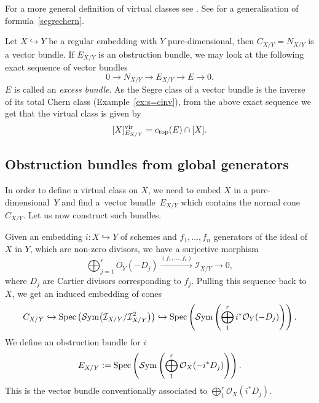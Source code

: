 \documentclass[pdftex]{sigma}
\numberwithin{equation}{section}
\newcommand{\vv}{\mathrm{vir}}
\begin{document}
\begin{Remark} For a more general definition of virtual classes see \cite[Definition 4.1]{siebert}. See \cite[Theorem~4.6]{siebert} for a generalisation of formula~\eqref{segrechern}.
\end{Remark}

\begin{Example}\label{excess}Let $X\hookrightarrow Y$ be a regular embedding with $Y$ pure-dimensional, then $C_{X/Y}=N_{X/Y}$ is a vector bundle. If $E_{X/Y}$ is an obstruction bundle, we may look at the following exact sequence of vector bundles
\[0\to N_{X/Y}\to E_{X/Y}\to E\to 0.\]
$E$ is called an \emph{excess bundle}. As the Segre class of a vector bundle is the inverse of its total Chern class (Example~\ref{ex:s=cinv}), from the above exact sequence we get that the virtual class is given by
\[[X]_{E_{X/Y}}^{\vv}=c_{\rm top}(E)\cap [X].\]
\end{Example}

\subsection{Obstruction bundles from global generators} \label{section:obs}
In order to define a virtual class on $X$, we need to embed $X$ in a pure-dimensional~$Y$ and find a~vector bundle~$E_{X/Y}$ which contains the normal cone~$C_{X/Y}$. Let us now construct such bundles.

Given an embedding $i\colon X\hookrightarrow Y$ of schemes and $f_1,\ldots, f_n$ generators of the ideal of~$X$ in $Y$, which are non-zero divisors, we have a surjective morphism
\[\bigoplus_{j=1}^rO_Y(-D_j)\xrightarrow{(f_1,\dots, f_r)}\mathcal{I}_{X/Y}\to 0, \]
where $D_j$ are Cartier divisors corresponding to $f_j$. Pulling this sequence back to $X$, we get an induced embedding of cones
\[C_{X/Y}\hookrightarrow\operatorname{Spec}\big({\mathcal S}{\rm ym}\big(\mathcal I_{X/Y}/\mathcal I_{X/Y}^2\big)\big)\hookrightarrow \operatorname{Spec}\left({\mathcal S}{\rm ym}\left(\bigoplus_1^ri^*\mathcal O_Y(-D_j)\right)\right).\]
We define an obstruction bundle for $i$
\[
E_{X/Y}:=\operatorname{Spec}\left({\mathcal S}{\rm ym}\left(\bigoplus_1^r\mathcal O_X(-i^*D_j)\right)\right).
\]
This is the vector bundle conventionally associated to $ \bigoplus_1^r\mathcal O_X(i^*D_j) $.
\end{document}

